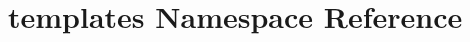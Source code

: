 \hypertarget{namespacetemplates}{}\section{templates Namespace Reference}
\label{namespacetemplates}
